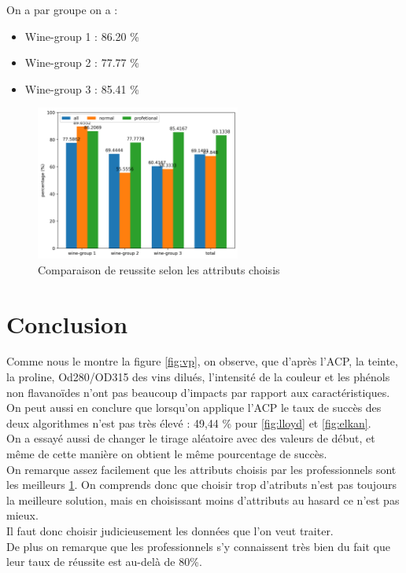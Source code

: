 \documentclass[a4paper,12pt]{article}
\begin{document}
On a par groupe on a :
\begin{itemize}
\item Wine-group 1 : 86.20 \%
\item Wine-group 2 : 77.77 \%
\item Wine-group 3 : 85.41 \%
\end{itemize}

\begin{figure}[h!] %
   \centering
   \includegraphics[width=0.6\textwidth]{differents_attributes.png} %
   \caption{Comparaison de reussite selon les attributs choisis}
   \label{fig:compare}
\end{figure}

\section{Conclusion}
\label{sec:conclusion}

Comme nous le montre la figure \ref{fig:vp}, on observe, que d'après l'ACP,  la teinte, la proline, Od280/OD315 des vins dilués, l'intensité de la couleur et les phénols non flavanoïdes n'ont pas beaucoup d'impacts par rapport aux caractéristiques.\\

On peut aussi en conclure que lorsqu'on applique l'ACP le taux de succès des deux algorithmes n'est pas très élevé : 49,44 \% pour \ref{fig:lloyd} et \ref{fig:elkan}.\\

On a essayé aussi de changer le tirage aléatoire avec des valeurs de début, et même de cette manière on obtient le même pourcentage de succès.\\

On remarque assez facilement que les attributs choisis par les professionnels sont les meilleurs \ref{fig:compare}. On comprends donc que choisir trop d'atributs n'est pas toujours la meilleure solution, mais en choisissant moins d'attributs au hasard ce n'est pas mieux.\\

Il faut donc choisir judicieusement les données que l'on veut traiter.\\

De plus on remarque que les professionnels s'y connaissent très bien du fait que leur taux de réussite est au-delà de 80\%. 
\end{document}
